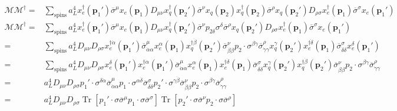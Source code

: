 \begin{align}
  \mathcal{M}\mathcal{M}^{\dagger}=&\sum_{\text{spins}}
a_L^4 x_e^{\dagger}(\mathbf{p}_1') \overline{\sigma}^{\mu}x_e(\mathbf{p}_1)   D_{\mu\nu}x_q^{\dagger}(\mathbf{p}_2') \overline{\sigma}^{\nu} x_q(\mathbf{p}_2) 
x_q^{\dagger}(\mathbf{p}_2) \overline{\sigma}^{\rho} x_q(\mathbf{p}_2') D_{\rho\sigma}
x_e^{\dagger}(\mathbf{p}_1) \overline{\sigma}^{\sigma}x_e(\mathbf{p}_1')
\end{align}
\begin{align}
  \mathcal{M}\mathcal{M}^{\dagger} =&\sum_{\text{spins}}
a_L^4 x_e^{\dagger}(\mathbf{p}_1') \overline{\sigma}^{\mu}x_e(\mathbf{p}_1)   D_{\mu\nu}x_q^{\dagger}(\mathbf{p}_2') \overline{\sigma}^{\nu} 
p_{2\delta}\sigma^{\delta} \overline{\sigma}^{\rho} x_q(\mathbf{p}_2') D_{\rho\sigma}
x_e^{\dagger}(\mathbf{p}_1) \overline{\sigma}^{\sigma}x_e(\mathbf{p}_1') \nonumber\\
=&\sum_{\text{spins}}a_L^4D_{\mu\nu} D_{\rho\sigma}  x_e^{\dagger\dot{\alpha}}(\mathbf{p}_1') \overline{\sigma}^{\mu}_{\dot{\alpha}\alpha}x_e^{\alpha}(\mathbf{p}_1)   x_q^{\dagger\dot{\beta}}(\mathbf{p}_2') \overline{\sigma}^{\nu}_{\dot{\beta}\beta} 
p_2 \cdot \sigma^{\beta\dot{\gamma}} \overline{\sigma}^{\rho}_{\dot{\gamma}\gamma} x_q^{\gamma}(\mathbf{p}_2')
x_e^{\dagger\dot{\delta}}(\mathbf{p}_1) \overline{\sigma}^{\sigma}_{\dot{\delta}\delta}x_e^{\delta}(\mathbf{p}_1') \nonumber\\
=&\sum_{\text{spins}}a_L^4D_{\mu\nu} D_{\rho\sigma} x_e^{\delta}(\mathbf{p}_1') x_e^{\dagger\dot{\alpha}}(\mathbf{p}_1') \overline{\sigma}^{\mu}_{\dot{\alpha}\alpha}x_e^{\alpha}(\mathbf{p}_1) x_e^{\dagger\dot{\delta}}(\mathbf{p}_1) \overline{\sigma}^{\sigma}_{\dot{\delta}\delta} x_q^{\gamma}(\mathbf{p}_2') x_q^{\dagger\dot{\beta}}(\mathbf{p}_2') \overline{\sigma}^{\nu}_{\dot{\beta}\beta} 
p_2\cdot \sigma^{\beta\dot{\gamma}} \overline{\sigma}^{\rho}_{\dot{\gamma}\gamma}  \nonumber\\
=&a_L^4D_{\mu\nu} D_{\rho\sigma} p_1'\cdot{\sigma}^{\delta\dot{\alpha}}   \overline{\sigma}^{\mu}_{\dot{\alpha}\alpha} p_1\cdot \sigma^{\alpha\dot{\delta}} \overline{\sigma}^{\sigma}_{\dot{\delta}\delta} p_2'\cdot {\sigma}^{\gamma\dot{\beta}}  \overline{\sigma}^{\nu}_{\dot{\beta}\beta} 
p_2\cdot \sigma^{\beta\dot{\gamma}} \overline{\sigma}^{\rho}_{\dot{\gamma}\gamma} 
\nonumber\\
=&a_L^4D_{\mu\nu} D_{\rho\sigma} \operatorname{Tr}\left[p_1'\cdot\sigma \overline{\sigma}^{\mu} p_1\cdot \sigma \overline{\sigma}^{\sigma}\right] 
               \operatorname{Tr}\left[p_2'\cdot \sigma \overline{\sigma}^{\nu} p_2\cdot \sigma \overline{\sigma}^{\rho}\right] 
\end{align}
